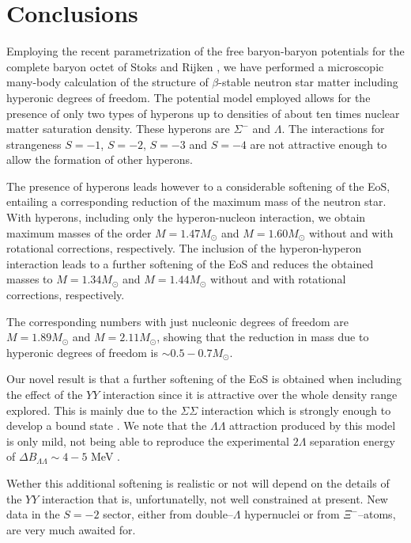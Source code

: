 \section{Conclusions}
\label{sec:conclu}

Employing the recent 
parametrization
of the free baryon-baryon potentials
for the complete  baryon octet
of Stoks and Rijken \cite{sr99}, we have performed a
microscopic many-body calculation of the structure of
$\beta$-stable neutron star matter including 
hyperonic degrees of freedom. 
The potential model employed allows for the presence of only two
types of hyperons up to densities of about ten times nuclear matter
saturation density. These hyperons are
$\Sigma^-$ and $\Lambda$. The interactions for strangeness
$S=-1$, $S=-2$, $S=-3$ and $S=-4$ are not attractive enough to allow
the formation of other hyperons. 

The presence of hyperons leads however
to a considerable softening of the EoS, entailing a corresponding reduction
of the maximum mass of the neutron star. With hyperons, including only
the hyperon-nucleon interaction, we obtain maximum
masses of the order $M=1.47M_\odot$ and $M=1.60 M_\odot$ without and 
with rotational corrections, respectively.
The inclusion of the hyperon-hyperon interaction leads to a
further softening of the EoS and
reduces the obtained masses to 
$M=1.34M_\odot$ and $M=1.44 M_\odot$ without and 
with rotational corrections, respectively.

The corresponding numbers with just nucleonic degrees of freedom are
$M=1.89 M_\odot$ and $M=2.11 M_\odot$, showing that the 
reduction in mass due to hyperonic degrees of freedom is 
$\sim 0.5-0.7M_\odot$.

Our novel result is that a further softening of the EoS is obtained when 
including the effect of the $YY$ interaction since it is attractive over 
the whole density range explored. This is mainly due to the $\Sigma\Sigma$
interaction which is strongly enough to develop a bound state \cite{sr99}.
We note that the $\Lambda\Lambda$ attraction produced by this model is only
mild, not 
being able to reproduce the experimental $2$$\Lambda$ separation energy of
$\Delta B_{\Lambda\Lambda} \sim 4-5$ MeV \cite{exper}.

Wether this additional softening is realistic or not will depend on the details 
of the $YY$ interaction that is, unfortunatelly, not well constrained at present.
New data in the $S=-2$ sector, either from double--$\Lambda$ hypernuclei or from
$\Xi^-$--atoms, are very much awaited for. 

